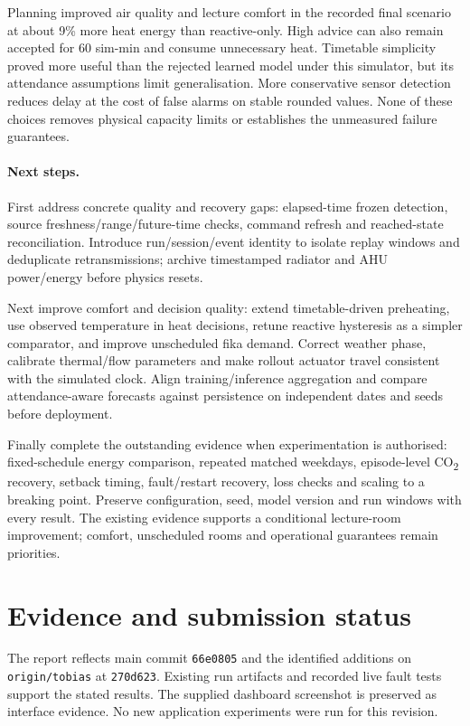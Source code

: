 \documentclass[11pt,a4paper]{article}
\begin{document}
Planning improved air quality and lecture comfort in the recorded final scenario at about 9\% more heat energy than reactive-only. High advice can also remain accepted for 60 sim-min and consume unnecessary heat. Timetable simplicity proved more useful than the rejected learned model under this simulator, but its attendance assumptions limit generalisation. More conservative sensor detection reduces delay at the cost of false alarms on stable rounded values. None of these choices removes physical capacity limits or establishes the unmeasured failure guarantees.

\paragraph{Next steps.}
First address concrete quality and recovery gaps: elapsed-time frozen detection, source freshness/range/future-time checks, command refresh and reached-state reconciliation. Introduce run/session/event identity to isolate replay windows and deduplicate retransmissions; archive timestamped radiator and AHU power/energy before physics resets.

Next improve comfort and decision quality: extend timetable-driven preheating, use observed temperature in heat decisions, retune reactive hysteresis as a simpler comparator, and improve unscheduled fika demand. Correct weather phase, calibrate thermal/flow parameters and make rollout actuator travel consistent with the simulated clock. Align training/inference aggregation and compare attendance-aware forecasts against persistence on independent dates and seeds before deployment.

Finally complete the outstanding evidence when experimentation is authorised: fixed-schedule energy comparison, repeated matched weekdays, episode-level CO\textsubscript{2} recovery, setback timing, fault/restart recovery, loss checks and scaling to a breaking point. Preserve configuration, seed, model version and run windows with every result. The existing evidence supports a conditional lecture-room improvement; comfort, unscheduled rooms and operational guarantees remain priorities.

\section*{Evidence and submission status}
The report reflects main commit \texttt{66e0805} and the identified additions on \texttt{origin/tobias} at \texttt{270d623}. Existing run artifacts and recorded live fault tests support the stated results. The supplied dashboard screenshot is preserved as interface evidence. No new application experiments were run for this revision.
\end{document}
